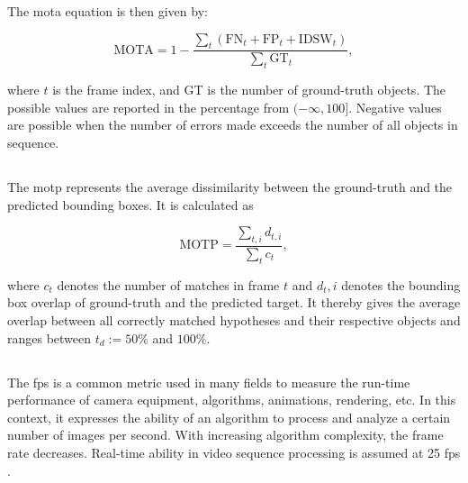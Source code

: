         The \gls{mota} equation is then given by:
        
        \begin{equation}
            \text{MOTA} = 1 - \frac{\sum_{t} \left( \text{FN}_t + \text{FP}_t + \text{IDSW}_t \right)}{\sum_{t}\text{GT}_t},
        \end{equation}
        
        where $t$ is the frame index, and GT is the number of ground-truth objects. The possible values are reported in the percentage from $(-\infty, 100]$. Negative values are possible when the number of errors made exceeds the number of all objects in sequence.
    
    \subsection{} 
        The \gls{motp} represents the average dissimilarity between the ground-truth and the predicted bounding boxes. It is calculated as 
        
        \begin{equation}
            \text{MOTP} = \frac{\sum_{t,i} d_{t,i}}{\sum_{t}c_t},
        \end{equation}
        
        where $c_t$ denotes the number of matches in frame $t$ and $d_t,i$ denotes the bounding box overlap of ground-truth and the predicted target. It thereby gives the average overlap between all correctly matched hypotheses and their respective objects and ranges between $t_d := 50\%$ and $100\%$. \cite{MOTChallenge2015}
    
    \subsection{} 
        The \gls{fps} is a common metric used in many fields to measure the run-time performance of camera equipment, algorithms, animations, rendering, etc. In this context, it expresses the ability of an algorithm to process and analyze a certain number of images per second. With increasing algorithm complexity, the frame rate decreases. Real-time ability in video sequence processing is assumed at 25 \gls{fps} \cite{MOTChallenge2015}.
